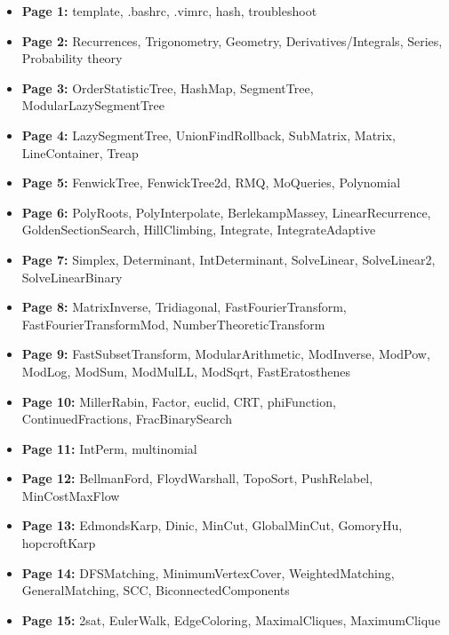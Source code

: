 \documentclass[9pt, a4paper, notitlepage]{extreport}
\begin{document}
	\maketeampage
	\begin{multicols*}{3}
	\thispagestyle{fancy}
	\setcounter{tocdepth}{0}

	\begin{itemize}[noitemsep]
	\raggedright
		\item \textbf{Page  1:} template, .bashrc, .vimrc, hash, troubleshoot
		\item \textbf{Page  2:} Recurrences, Trigonometry, Geometry, Derivatives/Integrals, Series, Probability theory
		\item \textbf{Page  3:} OrderStatisticTree, HashMap, SegmentTree, ModularLazySegmentTree
		\item \textbf{Page  4:} LazySegmentTree, UnionFindRollback, SubMatrix, Matrix, LineContainer, Treap
		\item \textbf{Page  5:} FenwickTree, FenwickTree2d, RMQ, MoQueries, Polynomial
		\item \textbf{Page  6:} PolyRoots, PolyInterpolate, BerlekampMassey, LinearRecurrence, GoldenSectionSearch, HillClimbing, Integrate, IntegrateAdaptive
		\item \textbf{Page  7:} Simplex, Determinant, IntDeterminant, SolveLinear, SolveLinear2, SolveLinearBinary
		\item \textbf{Page  8:} MatrixInverse, Tridiagonal, FastFourierTransform, FastFourierTransformMod, NumberTheoreticTransform
		\item \textbf{Page  9:} FastSubsetTransform, ModularArithmetic, ModInverse, ModPow, ModLog, ModSum, ModMulLL, ModSqrt, FastEratosthenes
		\item \textbf{Page 10:} MillerRabin, Factor, euclid, CRT, phiFunction, ContinuedFractions, FracBinarySearch
		\item \textbf{Page 11:} IntPerm, multinomial
		\item \textbf{Page 12:} BellmanFord, FloydWarshall, TopoSort, PushRelabel, MinCostMaxFlow
		\item \textbf{Page 13:} EdmondsKarp, Dinic, MinCut, GlobalMinCut, GomoryHu, hopcroftKarp
		\item \textbf{Page 14:} DFSMatching, MinimumVertexCover, WeightedMatching, GeneralMatching, SCC, BiconnectedComponents
		\item \textbf{Page 15:} 2sat, EulerWalk, EdgeColoring, MaximalCliques, MaximumClique

\end{itemize}
\end{multicols*}
\end{document}
